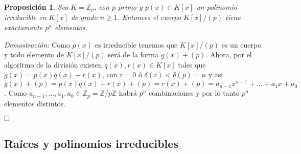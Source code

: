 \documentclass[12pt]{article}
\newtheorem{proposition}[theorem]{Proposición}
\begin{document}
\begin{proposition}Sea $K = \mathbb{Z}_p$, con $p$ primo y $p(x) \in K[x]$ un polinomio irreducible en $K[x]$ de grado $n \geq 1$. Entonces el cuerpo $K[x]/(p)$ tiene exactamente $p^n$ elementos.
\end{proposition}
\emph{Demostración: }Como $p(x)$ es irreducible tenemos que $K[x]/(p)$ es un cuerpo y todo elemento de $K[x]/(p)$ será de la forma $g(x) + (p)$. Ahora, por el algoritmo de la división existen $q(x), r(x) \in K[x]$ tales que $g(x) = p(x)q(x)+r(x)$, con $r = 0$ ó $\delta(r) <\delta(p) = n$ y asi $g(x) + (p) = p(x)q(x) + r(x) + (p) = r(x) +(p) = a_{n-1}x^{n-1} + \ldots + a_1x + a_0$. Como $a_{n-1}, \ldots, a_1, a_0 \in \mathbb{Z}_p= \mathbb{Z}/p\mathbb{Z}$ habrá $p^n$ combinaciones y por lo tanto $p^n$ elementos distintos.

$\hfill \square$

\subsection{Raíces y polinomios irreducibles}
\end{document}
